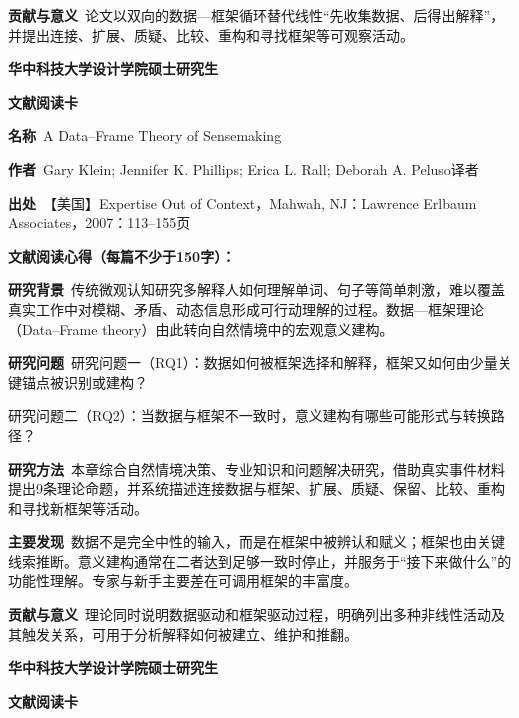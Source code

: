 \noindent\textbf{贡献与意义}\ 论文以双向的数据—框架循环替代线性“先收集数据、后得出解释”，并提出连接、扩展、质疑、比较、重构和寻找框架等可观察活动。\par
\clearpage
\begin{center}
{\songti\bfseries\fontsize{18.5pt}{27.75pt}\selectfont 华中科技大学设计学院硕士研究生\par}
{\songti\bfseries\fontsize{18.5pt}{27.75pt}\selectfont 文献阅读卡\par}
\end{center}
\vspace{0.25em}
\noindent\underline{}\par
\vspace{0.35em}
\noindent\textbf{名称}\ A Data–Frame Theory of Sensemaking\par
\noindent\textbf{作者}\ Gary Klein; Jennifer K. Phillips; Erica L. Rall; Deborah A. Peluso\quad 译者\par
\noindent\textbf{出处}\ 【美国】Expertise Out of Context，Mahwah, NJ：Lawrence Erlbaum Associates，2007：113–155\quad 页\par
\vspace{0.35em}
\noindent\textbf{文献阅读心得（每篇不少于150字）：}\par
\noindent\textbf{研究背景}\ 传统微观认知研究多解释人如何理解单词、句子等简单刺激，难以覆盖真实工作中对模糊、矛盾、动态信息形成可行动理解的过程。数据—框架理论（Data–Frame theory）由此转向自然情境中的宏观意义建构。\par
\noindent\textbf{研究问题}\ 研究问题一（RQ1）：数据如何被框架选择和解释，框架又如何由少量关键锚点被识别或建构？\par
研究问题二（RQ2）：当数据与框架不一致时，意义建构有哪些可能形式与转换路径？\par
\noindent\textbf{研究方法}\ 本章综合自然情境决策、专业知识和问题解决研究，借助真实事件材料提出9条理论命题，并系统描述连接数据与框架、扩展、质疑、保留、比较、重构和寻找新框架等活动。\par
\noindent\textbf{主要发现}\ 数据不是完全中性的输入，而是在框架中被辨认和赋义；框架也由关键线索推断。意义建构通常在二者达到足够一致时停止，并服务于“接下来做什么”的功能性理解。专家与新手主要差在可调用框架的丰富度。\par
\noindent\textbf{贡献与意义}\ 理论同时说明数据驱动和框架驱动过程，明确列出多种非线性活动及其触发关系，可用于分析解释如何被建立、维护和推翻。\par
\clearpage
\begin{center}
{\songti\bfseries\fontsize{18.5pt}{27.75pt}\selectfont 华中科技大学设计学院硕士研究生\par}
{\songti\bfseries\fontsize{18.5pt}{27.75pt}\selectfont 文献阅读卡\par}
\end{center}
